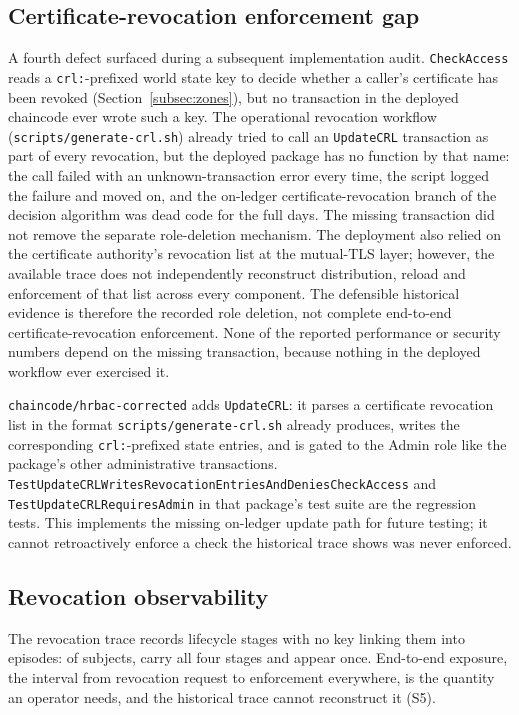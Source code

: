 \documentclass[a4paper,fleqn]{cas-dc}
\begin{document}
\subsection{Certificate-revocation enforcement gap}
\label{subsec:pm_crl}

A fourth defect surfaced during a subsequent implementation audit. \texttt{CheckAccess} reads a \texttt{crl:}-prefixed world
state key to decide whether a caller's certificate has been revoked
(Section~\ref{subsec:zones}), but no transaction in the deployed chaincode
ever wrote such a key. The operational revocation workflow
(\texttt{scripts/generate-crl.sh}) already tried to call an
\texttt{UpdateCRL} transaction as part of every revocation, but the
deployed package has no function by that name: the call failed with an
unknown-transaction error every time, the script logged the failure and
moved on, and the on-ledger certificate-revocation branch of the decision
algorithm was dead code for the full \DeployDays{} days. The missing transaction did not remove the separate role-deletion mechanism. The deployment also relied on the certificate authority's revocation list at the mutual-TLS layer; however, the available trace does not independently reconstruct distribution, reload and enforcement of that list across every component. The defensible historical evidence is therefore the recorded role deletion, not complete end-to-end certificate-revocation enforcement. None of the reported performance or
security numbers depend on the missing transaction, because nothing in the
deployed workflow ever exercised it.

\texttt{chaincode/hrbac-corrected} adds \texttt{UpdateCRL}: it parses a
certificate revocation list in the format
\texttt{scripts/generate-crl.sh} already produces, writes the
corresponding \texttt{crl:}-prefixed state entries, and is gated to the
Admin role like the package's other administrative transactions.
\texttt{TestUpdateCRLWrites\-RevocationEntries\-AndDeniesCheckAccess} and
\texttt{TestUpdateCRLRequiresAdmin} in that package's test suite are the
regression tests. This implements the missing on-ledger update path for future testing; it cannot
retroactively enforce a check the historical trace shows was never
enforced.

\subsection{Revocation observability}
\label{subsec:pm_revocation}

The revocation trace records lifecycle stages with no key linking them
into episodes: of \RevSubjects{} subjects, \RevComplete{} carry all four
stages and \RevSingleStage{} appear once. End-to-end exposure, the
interval from revocation request to enforcement everywhere, is the
quantity an operator needs, and the historical trace cannot reconstruct it
(S5).
\end{document}
